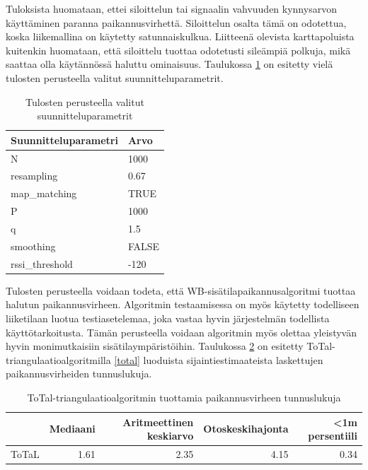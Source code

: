 \documentclass[
  12pt,
  a4paper, twoside]{book}
\begin{document}
Tuloksista huomataan, ettei siloittelun tai signaalin vahvuuden kynnysarvon käyttäminen paranna paikannusvirhettä. Siloittelun osalta tämä on odotettua, koska liikemallina on käytetty satunnaiskulkua. Liitteenä olevista karttapoluista kuitenkin huomataan, että siloittelu tuottaa odotetusti sileämpiä polkuja, mikä saattaa olla käytännössä haluttu ominaisuus. Taulukossa \ref{tab:tulokset-final} on esitetty vielä tulosten perusteella valitut suunnitteluparametrit.

\begin{table}

\caption{\label{tab:tulokset-final}Tulosten perusteella valitut suunnitteluparametrit}
\centering
\begin{tabular}[t]{ll}
\toprule
Suunnitteluparametri & Arvo\\
\midrule
N & 1000\\
resampling & 0.67\\
map\_matching & TRUE\\
P & 1000\\
q & 1.5\\
\addlinespace
smoothing & FALSE\\
rssi\_threshold & -120\\
\bottomrule
\end{tabular}
\end{table}

Tulosten perusteella voidaan todeta, että WB-sisätilapaikannusalgoritmi tuottaa halutun paikannusvirheen. Algoritmin testaamisessa on myös käytetty todelliseen liiketilaan luotua testiasetelemaa, joka vastaa hyvin järjestelmän todellista käyttötarkoitusta. Tämän perusteella voidaan algoritmin myös olettaa yleistyvän hyvin monimutkaisiin sisätilaympäristöihin. Taulukossa \ref{tab:tulokset-total} on esitetty ToTal-triangulaatioalgoritmilla \ref{total} luoduista sijaintiestimaateista laskettujen paikannusvirheiden tunnuslukuja.

\begin{table}

\caption{\label{tab:tulokset-total}ToTal-triangulaatioalgoritmin tuottamia paikannusvirheen tunnuslukuja}
\centering
\begin{tabular}[t]{lrrrr}
\toprule
  & Mediaani & Aritmeettinen keskiarvo & Otoskeskihajonta & <1m persentiili\\
\midrule
ToTaL & 1.61 & 2.35 & 4.15 & 0.34\\
\bottomrule
\end{tabular}
\end{table}
\end{document}
